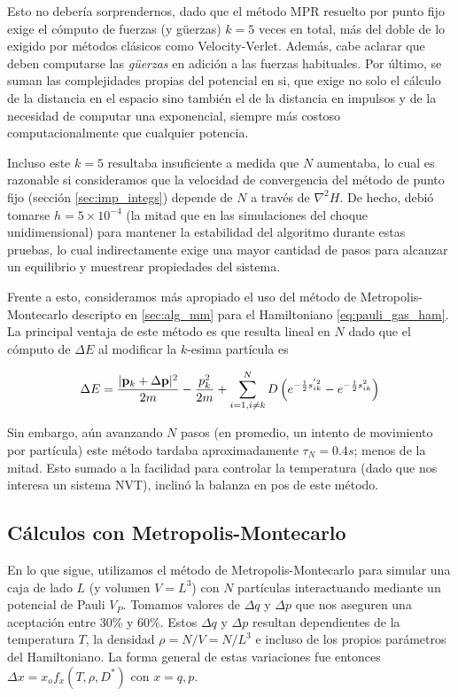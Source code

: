 Esto no debería sorprendernos, dado que el método MPR resuelto por punto fijo exige el cómputo de fuerzas (y güerzas) $k=5$ veces en total, más del doble de lo exigido por métodos clásicos como Velocity-Verlet.
Además, cabe aclarar que deben computarse las \textit{güerzas} en adición a las fuerzas habituales.
Por último, se suman las complejidades propias del potencial en si, que exige no solo el cálculo de la distancia en el espacio sino también el de la distancia en impulsos y de la necesidad
de computar una exponencial, siempre más costoso computacionalmente que cualquier potencia.

Incluso este $k=5$ resultaba insuficiente a medida que $N$ aumentaba, lo cual es razonable si consideramos que la velocidad de convergencia del método de punto fijo (sección \ref{sec:imp_integs})
depende de $N$ a través de $\nabla^2H$.
De hecho, debió tomarse $h=5\times10^{-4}$ (la mitad que en las simulaciones del choque unidimensional) para mantener la estabilidad del algoritmo durante estas pruebas, 
lo cual indirectamente exige una mayor cantidad de pasos para alcanzar un equilibrio y muestrear propiedades del sistema.

Frente a esto, consideramos más apropiado el uso del método de Metropolis-Montecarlo descripto en \ref{sec:alg_mm} para el Hamiltoniano \eqref{eq:pauli_gas_ham}.
La principal ventaja de este método es que resulta lineal en $N$ dado que el cómputo de $\Delta E$ al modificar la $k$-esima partícula es

\begin{equation}{\label{eq:delta_E}}
 \Delta E =  \frac{|\mathbf{p}_k + \Delta \mathbf{p}|^2}{2m} - \frac{p_k^2}{2m} + \sum_{i=1, i\neq k}^N D\left( e^{-\frac{1}{2}s_{ik}^{'2}}-e^{-\frac{1}{2}s_{ik}^2}  \right)
\end{equation}

Sin embargo, aún avanzando $N$ pasos (en promedio, un intento de movimiento por partícula) este método tardaba aproximadamente $\tau_N = 0.4s$; menos de la mitad.
Esto sumado a la facilidad para controlar la temperatura (dado que nos interesa un sistema NVT), inclinó la balanza en pos de este método.

\subsection{Cálculos con Metropolis-Montecarlo}

En lo que sigue, utilizamos el método de Metropolis-Montecarlo para simular una caja de lado $L$ (y volumen $V=L^3$) con $N$ partículas interactuando mediante un potencial de Pauli $V_P$.
Tomamos valores de $\Delta q$ y $\Delta p$ que nos aseguren una aceptación entre $30\%$ y $60\%$.
Estos $\Delta q$ y $\Delta p$ resultan dependientes de la temperatura $T$, la densidad $\rho = N/V = N/L^3$ e incluso de los propios parámetros del Hamiltoniano.
La forma general de estas variaciones fue entonces $\Delta x = x_o f_x(T, \rho, D^*)$  con $x=q,p$.


